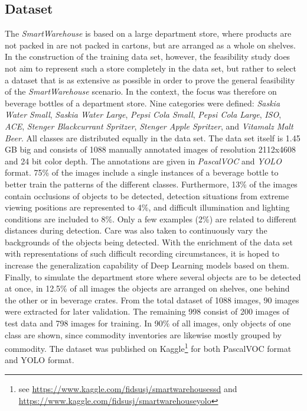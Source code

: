 \documentclass[a4paper, 10pt, journal]{wissarbIEEE}      %
\begin{document}
\subsection{Dataset}

The \textit{SmartWarehouse} is based on a large department store, where products are not packed in
are not packed in cartons, but are arranged as a whole on shelves. In the construction of the training data set, however, the feasibility study does not aim to represent such a store completely in the data set, but rather to select a dataset that is as extensive as possible in order to prove the general feasibility of the \textit{SmartWarehouse} scenario. In the context, the focus was therefore on beverage bottles of a department store. Nine categories were defined: \textit{Saskia Water Small}, \textit{Saskia Water Large}, \textit{Pepsi Cola Small}, \textit{Pepsi Cola Large}, \textit{ISO}, \textit{ACE}, \textit{Stenger Blackcurrant Spritzer}, \textit{Stenger Apple Spritzer}, and \textit{Vitamalz Malt Beer}. All classes are distributed equally in the data set. The data set itself is 1.45 GB big and consists of 1088 manually annotated images of resolution 2112x4608 and 24 bit color depth. The annotations are given in \textit{PascalVOC} and \textit{YOLO} format. 75\% of the images include a single instances of a beverage bottle to better train the patterns of the different classes. Furthermore, 13\% of the images contain occlusions of objects to be detected, detection situations from extreme viewing positions are represented to 4\%, and difficult illumination and lighting conditions are included to 8\%. Only a few examples (2\%) are related to different distances during detection. Care was also taken to continuously vary the backgrounds of the objects being detected. With the enrichment of the data set with representations of such difficult recording circumstances, it is hoped to increase the generalization capability of Deep Learning models based on them. Finally, to simulate the department store where several objects are to be detected at once, in 12.5\% of all images the objects are arranged on shelves, one behind the other or in beverage crates. From the total dataset of 1088 images, 90 images were extracted for later validation. The remaining 998 consist of 200 images of test data and 798 images for training. In 90\% of all images, only objects of one class are shown, since commodity inventories are likewise mostly grouped by commodity. The dataset was published on Kaggle\footnote{see \url{https://www.kaggle.com/fidsusj/smartwarehousessd} and \url{https://www.kaggle.com/fidsusj/smartwarehouseyolo}} for both PascalVOC format and YOLO format.
\end{document}
